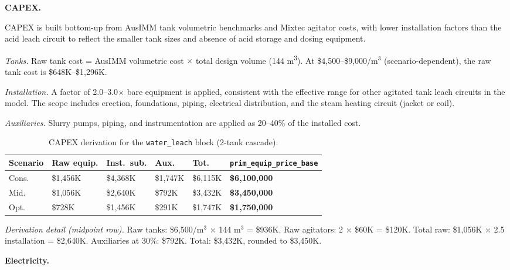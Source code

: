 \medskip
\noindent\textbf{CAPEX.}\quad

CAPEX is built bottom-up from AusIMM tank volumetric benchmarks and Mixtec agitator costs, with lower installation factors than the acid leach circuit to reflect the smaller tank sizes and absence of acid storage and dosing equipment.

\textit{Tanks.} Raw tank cost = AusIMM volumetric cost $\times$ total design volume (144 \si{m^3}). At \$4,500--\$9,000/m$^3$ (scenario-dependent), the raw tank cost is \$648K--\$1,296K.

\textit{Installation.} A factor of 2.0--3.0$\times$ bare equipment is applied, consistent with the effective range for other agitated tank leach circuits in the model. The scope includes erection, foundations, piping, electrical distribution, and the steam heating circuit (jacket or coil).
 
\textit{Auxiliaries.} Slurry pumps, piping, and instrumentation are applied as 20--40\% of the installed cost.
 
\begin{table}[h!]
\caption{CAPEX derivation for the \texttt{water\_leach} block (2-tank cascade).}
\centering
\begin{tabular}{>{\raggedright\arraybackslash}p{2.0cm}
				>{\raggedright\arraybackslash}p{1.8cm}
				>{\raggedright\arraybackslash}p{1.8cm}
				>{\raggedright\arraybackslash}p{1.8cm}
				>{\raggedright\arraybackslash}p{1.5cm}
				>{\raggedright\arraybackslash}p{3.0cm}}
\toprule
\textbf{Scenario} & \textbf{Raw equip.} & \textbf{Inst.\ sub.} & \textbf{Aux.} & \textbf{Tot.} & \texttt{prim\_equip\_price\_base} \\
\midrule
Cons. & \$1,456K & \$4,368K & \$1,747K & \$6,115K & \textbf{\$6,100,000} \\
Mid.  & \$1,056K & \$2,640K & \$792K   & \$3,432K & \textbf{\$3,450,000} \\
Opt.  & \$728K   & \$1,456K & \$291K   & \$1,747K & \textbf{\$1,750,000} \\
\bottomrule
\end{tabular}
\end{table}
 
\noindent \textit{Derivation detail (midpoint row).} Raw tanks: \$6,500/m$^3$ $\times$ 144 m$^3$ = \$936K. Raw agitators: 2 $\times$ \$60K = \$120K. Total raw: \$1,056K $\times$ 2.5 installation = \$2,640K. Auxiliaries at 30\%: \$792K. Total: \$3,432K, rounded to \$3,450K.


\medskip
\noindent\textbf{Electricity.}\quad


